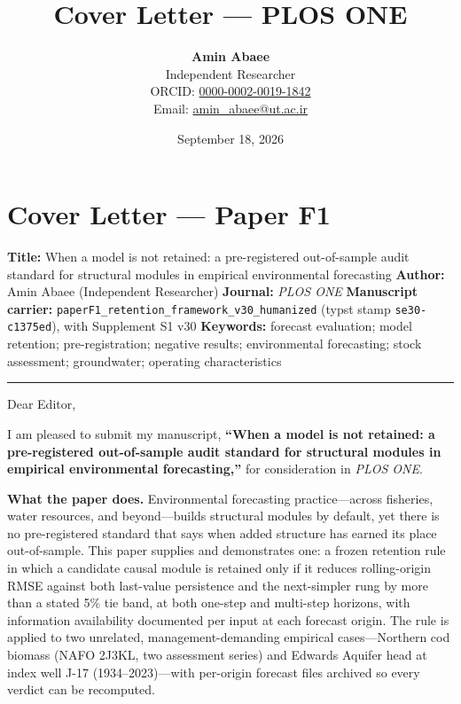 \documentclass[11pt]{article}
\title{Cover Letter — PLOS ONE}
\author{\textbf{Amin Abaee}\\ Independent Researcher\\[2pt] ORCID: \href{https://orcid.org/0000-0002-0019-1842}{0000-0002-0019-1842}\\ Email: \href{mailto:amin_abaee@ut.ac.ir}{amin_abaee@ut.ac.ir}}
\date{September 18, 2026}
\begin{document}
\maketitle

\section{Cover Letter --- Paper F1}\label{cover-letter-paper-f1}

\textbf{Title:} When a model is not retained: a pre-registered
out-of-sample audit standard for structural modules in empirical
environmental forecasting \textbf{Author:} Amin Abaee (Independent
Researcher) \textbf{Journal:} \emph{PLOS ONE} \textbf{Manuscript
carrier:} \texttt{paperF1\_retention\_framework\_v30\_humanized} (typst
stamp \texttt{se30-c1375ed}), with Supplement S1 v30 \textbf{Keywords:}
forecast evaluation; model retention; pre-registration; negative
results; environmental forecasting; stock assessment; groundwater;
operating characteristics

\begin{center}\rule{0.5\linewidth}{0.5pt}\end{center}

Dear Editor,

I am pleased to submit my manuscript, \textbf{``When a model is not
retained: a pre-registered out-of-sample audit standard for structural
modules in empirical environmental forecasting,''} for consideration in
\emph{PLOS ONE}.

\textbf{What the paper does.} Environmental forecasting
practice---across fisheries, water resources, and beyond---builds
structural modules by default, yet there is no pre-registered standard
that says when added structure has earned its place out-of-sample. This
paper supplies and demonstrates one: a frozen retention rule in which a
candidate causal module is retained only if it reduces rolling-origin
RMSE against both last-value persistence and the next-simpler rung by
more than a stated 5\% tie band, at both one-step and multi-step
horizons, with information availability documented per input at each
forecast origin. The rule is applied to two unrelated,
management-demanding empirical cases---Northern cod biomass (NAFO 2J3KL,
two assessment series) and Edwards Aquifer head at index well J-17
(1934--2023)---with per-origin forecast files archived so every verdict
can be recomputed.
\end{document}
